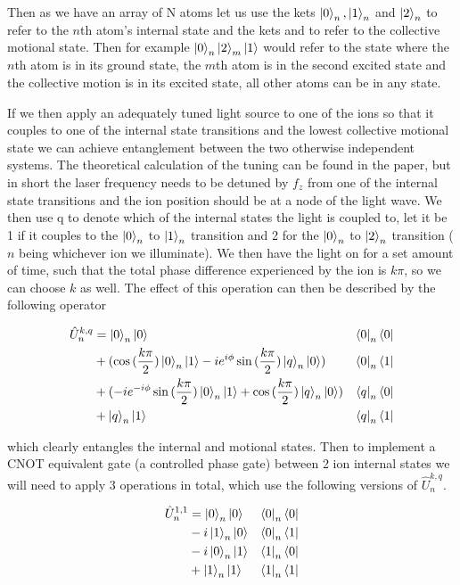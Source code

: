 Then as we have an array of N atoms let us use the kets $\ket{0}_n, \ket{1}_n$ and $\ket{2}_n$ to refer to the $n$th atom's internal state and the kets \kz and \ko to refer to the collective motional state.
Then for example $\ket{0}_n\ket{2}_m\ket{1}$ would refer to the state where the $n$th atom is in its ground state, the $m$th atom is in the second excited state and the collective motion is in its excited state, all other atoms can be in any state.

If we then apply an adequately tuned light source to one of the ions so that it couples to one of the internal state transitions and the lowest collective motional state we can achieve entanglement between the two otherwise independent systems.
The theoretical calculation of the tuning can be found in the paper, but in short the laser frequency needs to be detuned by $f_z$ from one of the internal state transitions and the ion position should be at a node of the light wave.
We then use q to denote which of the internal states the light is coupled to, let it be 1 if it couples to the $\ket{0}_n$ to $\ket{1}_n$ transition and 2 for the $\ket{0}_n$ to $\ket{2}_n$ transition ($n$ being whichever ion we illuminate).
We then have the light on for a set amount of time, such that the total phase difference experienced by the ion is $k \pi$, so we can choose $k$ as well.
The effect of this operation can then be described by the following operator

\newcommand{\bigfrac}{(\frac{k\pi}{2})}
\begin{equation}
    \begin{aligned}
        \hat{U}^{k,q}_n &= \ket{0}_n\ket{0}&\bra{0}_n\bra{0} \\
        &+ (\cos{\bigfrac}\ket{0}_n\ket{1} -i e^{i\phi} \sin{\bigfrac}\ket{q}_n\ket{0})&\bra{0}_n\bra{1} \\
        &+ (-i e^{-i\phi} \sin{\bigfrac}\ket{0}_n\ket{1} + \cos{\bigfrac}\ket{q}_n\ket{0})&\bra{q}_n\bra{0} \\
        &+ \ket{q}_n\ket{1}&\bra{q}_n\bra{1}
    \end{aligned}
\end{equation}

which clearly entangles the internal and motional states.
Then to implement a CNOT equivalent gate (a controlled phase gate) between 2 ion internal states we will need to apply 3 operations in total, which use the following versions of $\hat{U}^{k,q}_n$.

\begin{equation}
    \begin{aligned}
        \hat{U}^{1,1}_n &= \ket{0}_n\ket{0}&\bra{0}_n\bra{0} \\
        &-i \ket{1}_n\ket{0}&\bra{0}_n\bra{1} \\
        &-i \ket{0}_n\ket{1}&\bra{1}_n\bra{0} \\
        &+ \ket{1}_n\ket{1}&\bra{1}_n\bra{1}
    \end{aligned}
\end{equation}

